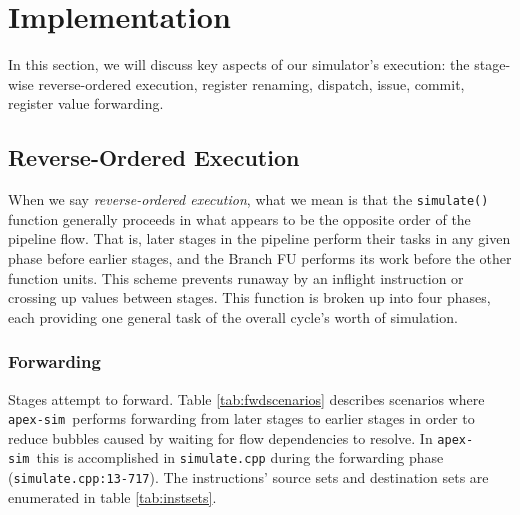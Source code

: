 \documentclass[12pt]{article}
\newcommand{\codename}[0]{\texttt{apex-sim}~}
\begin{document}
\section{Implementation}
\label{sec:implementation}
In this section, we will discuss key aspects of our simulator's execution: the stage-wise reverse-ordered execution, register renaming, dispatch, issue, commit, register value forwarding.

\subsection{Reverse-Ordered Execution}
When we say \textit{reverse-ordered execution}, what we mean is that the \texttt{simulate()} function generally proceeds in what appears to be the opposite order of the pipeline flow. 
That is, later stages in the pipeline perform their tasks in any given phase before earlier stages, and the Branch FU performs its work before the other function units. 
This scheme prevents runaway by an inflight instruction or crossing up values between stages.
This function is broken up into four phases, each providing one general task of the overall cycle's worth of simulation. 

\subsubsection{Forwarding}
Stages attempt to forward. 
Table \ref{tab:fwdscenarios} describes scenarios where \codename performs forwarding from later stages to earlier stages in order to reduce bubbles caused by waiting for flow dependencies to resolve. 
In \codename this is accomplished in \texttt{simulate.cpp} during the forwarding phase (\texttt{simulate.cpp:13-717}).
The instructions' source sets and destination sets are enumerated in table \ref{tab:instsets}.
\end{document}

